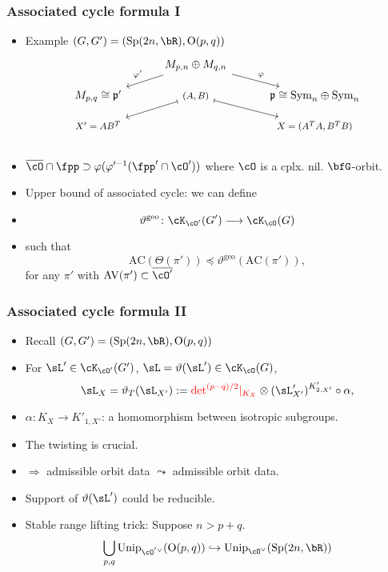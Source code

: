 \documentclass[t,mathserif,11pt,usenames,dvipsnames]{beamer}
\theoremstyle{plain}
\theoremstyle{definition}
\newcommand{\rO}{\mathrm{O}}
\newcommand{\AC}{\mathrm{AC}}
\newcommand{\AV}{\mathrm{AV}}
\providecommand{\bcO}{{\overline{\cO}}}
\def\Sp{{\mathrm{Sp}}}
\def\Unip{{\mathrm{Unip}}}
\def\red{\color{red}}
\def\lblue{\color{blue}}
\def\vcO{\cO^\vee}
\begin{document}
\begin{frame}[label=AC]
  \frametitle{Associated cycle formula I}
  \begin{itemize}[<+->]
  \item Example $(G,G')=(\Sp(2n,\bR), \rO(p,q))$ 
    \[
      \begin{tikzcd}[ampersand replacement=\&,column sep=3em, row sep=1em]
        \& M_{p,n}\oplus M_{q,n} \ar[rd,"\varphi"]
        \ar[ld,"\varphi'"'] \& \\
        M_{p,q}\cong {\mathfrak{p}'} \&  \text{\footnotesize $(A,B)$} \ar[rd,mapsto]\ar[ld,mapsto]\& {\mathfrak p}\cong
        \mathrm{Sym}_n\oplus \mathrm{Sym}_n\\
       \text{\footnotesize $X'=AB^T$} \& \& \text{\footnotesize $X = (A^T A,B^T B)$} \\
      \end{tikzcd}
    \]
  \item $\bcO \cap \fpp \supset \varphi(\varphi'^{-1}(\fpp'\cap \cO'))$ where
    $\cO$ is a cplx. nil. $\bfG$-orbit. 
  \item {\lblue Upper bound} of associated cycle: we can define 
  \item[]
    \[\vartheta^{\text{geo}}\colon
       \cK_{\cO'}(G') \longrightarrow \cK_{\cO}(G)\]
   \item[] such that
    \[
       \AC(\Theta(\pi'))\preceq \vartheta^{\text{geo}} (\AC(\pi')),
     \]
     for any $\pi'$ with $\AV(\pi')\subset \overline{\cO'}$
  \end{itemize}
\end{frame}

\begin{frame}[label=AC]
  \frametitle{Associated cycle formula II}
  \begin{itemize}[<+->]
  \item Recall 
    $(G,G')=(\Sp(2n,\bR), \rO(p,q))$
  \item For $\sL' \in \cK_{\cO'}(G')$, $\sL = \vartheta(\sL')\in \cK_{\cO}(G)$,
    \[
      \sL_X = \vartheta_{T}(\sL_{X'}):= {\red {\det}^{(p-q)/2}|_{K_{X}}} 
     \otimes (\sL'_{X'})^{K'_{2,X'}} \circ \alpha,
    \]
  \item[] $\alpha\colon K_X \longrightarrow K'_{1,X'}$:
     a homomorphism between isotropic subgroups.
  \item The twisting is {\lblue crucial}. 
  \item[] $\Rightarrow$ {\lblue admissible orbit data $\leadsto$ admissible orbit data. }

  \item Support of $\vartheta(\sL')$ could be reducible. 

  \item Stable range lifting trick: Suppose $n > p+q$. 
    \[
      \bigcup_{p,q}\Unip_{\cO^{'\vee}}(\rO(p,q)) \hookrightarrow \Unip_{\vcO}(\Sp(2n,\bR))
    \]
  \end{itemize}
\end{frame} 
\end{document}
